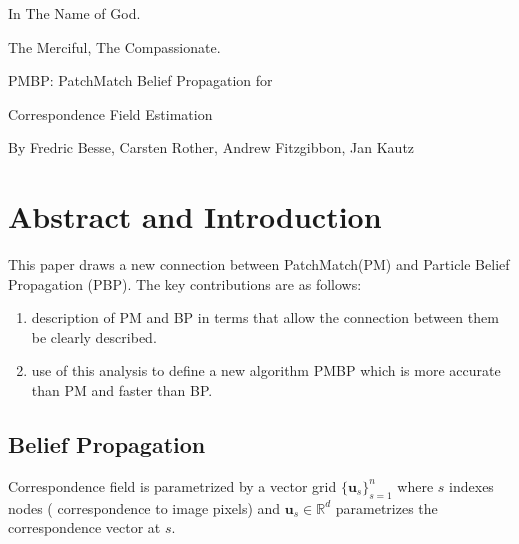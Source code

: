 \documentclass[a4paper,12pt]{article}
\begin{document}
\begin{center}
In The Name of God.

The Merciful, The Compassionate.
\vskip 1cm
{\Large\bfseries{PMBP: PatchMatch Belief Propagation for

Correspondence Field Estimation}}

\vskip 0.2cm
\tiny{By Fredric Besse, Carsten Rother, Andrew Fitzgibbon, Jan Kautz}
\end{center}

\section{Abstract and Introduction}
This paper draws a new connection between PatchMatch(PM) and Particle Belief Propagation (PBP).
The key contributions are as follows:
\begin{enumerate}
\item description of PM and BP in terms that allow the connection between them be clearly described.
\item use of this analysis to define a new algorithm PMBP which is more accurate than PM and faster than BP. 
\end{enumerate}

\subsection{Belief Propagation}
Correspondence field is parametrized by a vector grid $\{\mathbf{u}_s\}_{s=1}^{n}$ where $s$ indexes nodes ( correspondence to image pixels) and  $\mathbf{u}_s \in \mathbb{R}^d$ parametrizes the correspondence vector at $s$.
\end{document}
